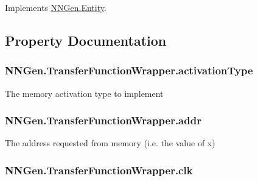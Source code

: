 Implements \hyperlink{class_n_n_gen_1_1_entity_a1111d498446be08b20583b9625893a52}{N\+N\+Gen.\+Entity}.



\subsection{Property Documentation}
\hypertarget{class_n_n_gen_1_1_transfer_function_wrapper_a6e15bcbf79f66a23f040cbcc69fec3d2}{}
\subsubsection[{activation\+Type}]{ N\+N\+Gen.\+Transfer\+Function\+Wrapper.\+activation\+Type\hspace{0.3cm}{\ttfamily [get]}}\label{class_n_n_gen_1_1_transfer_function_wrapper_a6e15bcbf79f66a23f040cbcc69fec3d2}


The memory activation type to implement 

\hypertarget{class_n_n_gen_1_1_transfer_function_wrapper_a0b1bd686fd58589ecee085e57596d2e7}{}
\subsubsection[{addr}]{ N\+N\+Gen.\+Transfer\+Function\+Wrapper.\+addr\hspace{0.3cm}{\ttfamily [get]}}\label{class_n_n_gen_1_1_transfer_function_wrapper_a0b1bd686fd58589ecee085e57596d2e7}


The address requested from memory (i.\+e. the value of x) 

\hypertarget{class_n_n_gen_1_1_transfer_function_wrapper_a4db456cd0b50d330f6b221032d35cc81}{}
\subsubsection[{clk}]{ N\+N\+Gen.\+Transfer\+Function\+Wrapper.\+clk\hspace{0.3cm}{\ttfamily [get]}}\label{class_n_n_gen_1_1_transfer_function_wrapper_a4db456cd0b50d330f6b221032d35cc81}


